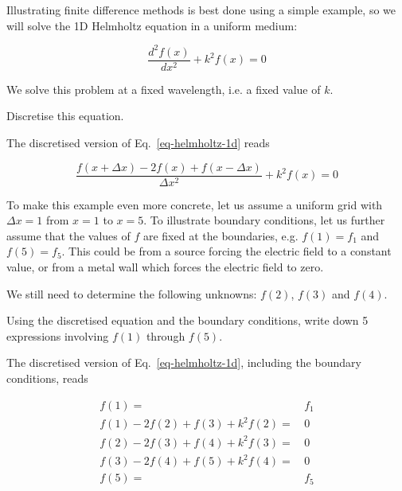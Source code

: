 \pagebreak



Illustrating finite difference methods is best done using a simple example, so we will solve the 1D Helmholtz equation in a uniform medium:

\begin{equation}
\frac{d^2 f(x)}{d x^2} + k^2 f(x) = 0 \label{eq-helmholtz-1d}
\end{equation} 

We solve this problem at a fixed wavelength, i.e. a fixed value of $k$.

\begin{cue}
  Discretise this equation.
\end{cue}

The discretised version of Eq.~\ref{eq-helmholtz-1d} reads

\begin{equation}
\frac{f(x + \Delta x) -2 f(x) + f(x- \Delta x)}{ \Delta x^2} + k^2 f(x) = 0 \label{eq-hh-diff}
\end{equation}  
 
To make this example even more concrete, let us assume a uniform grid with $\Delta x=1$ from $x=1$ to $x=5$. To illustrate boundary conditions, let us further assume that the values of $f$ are fixed at the boundaries, e.g. $f(1)=f_1$ and $f(5)=f_5$. This could be from a source forcing the electric field to a constant value, or from a metal wall which forces the electric field to zero. 

We still need to determine the following unknowns: $f(2)$, $f(3)$ and $f(4)$.


\begin{cue}
Using the discretised equation and the boundary conditions, write down 5 expressions involving $f(1)$ through $f(5)$.
\end{cue}

The discretised version of Eq.~\ref{eq-helmholtz-1d}, including the boundary conditions, reads

\begin{align}
f(1)=& \, f_1 \\
f(1) -2f(2) + f(3) + k^2 f(2) =& \, 0 \\
f(2) -2f(3) + f(4) + k^2 f(3) =& \, 0\\
f(3) -2f(4) + f(5) + k^2 f(4) =& \, 0\\
f(5)=& \, f_5
\end{align} 

